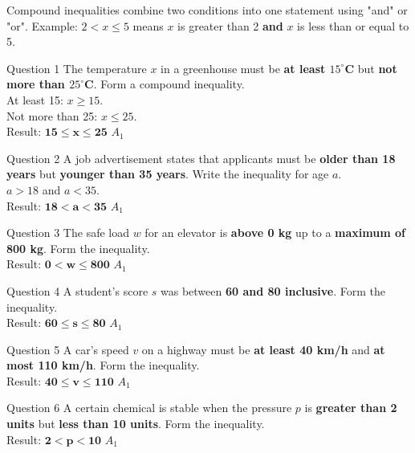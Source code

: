 \documentclass[12pt, a4paper, oneside]{article}
\begin{document}
\begin{tcolorbox}[colback=lightgrey, colframe=primaryblue, title=\textbf{Key Concept: Compound Inequalities}, arc=5pt]
    Compound inequalities combine two conditions into one statement using "and" or "or". 
    Example: $2 < x \leq 5$ means $x$ is greater than 2 \textbf{and} $x$ is less than or equal to 5.
\end{tcolorbox}

\begin{solvingbox}{Question 1}
The temperature $x$ in a greenhouse must be \textbf{at least $15^\circ$C} but \textbf{not more than $25^\circ$C}. Form a compound inequality. \\
At least 15: $x \geq 15$. \\
Not more than 25: $x \leq 25$. \\
Result: $\mathbf{15 \leq x \leq 25}$ \hfill $A_1$
\end{solvingbox}

\begin{solvingbox}{Question 2}
A job advertisement states that applicants must be \textbf{older than 18 years} but \textbf{younger than 35 years}. Write the inequality for age $a$. \\
$a > 18$ and $a < 35$. \\
Result: $\mathbf{18 < a < 35}$ \hfill $A_1$
\end{solvingbox}

\begin{solvingbox}{Question 3}
The safe load $w$ for an elevator is \textbf{above 0 kg} up to a \textbf{maximum of 800 kg}. Form the inequality. \\
Result: $\mathbf{0 < w \leq 800}$ \hfill $A_1$
\end{solvingbox}

\begin{solvingbox}{Question 4}
A student's score $s$ was between \textbf{60 and 80 inclusive}. Form the inequality. \\
Result: $\mathbf{60 \leq s \leq 80}$ \hfill $A_1$
\end{solvingbox}

\begin{solvingbox}{Question 5}
A car's speed $v$ on a highway must be \textbf{at least 40 km/h} and \textbf{at most 110 km/h}. Form the inequality. \\
Result: $\mathbf{40 \leq v \leq 110}$ \hfill $A_1$
\end{solvingbox}

\begin{solvingbox}{Question 6}
A certain chemical is stable when the pressure $p$ is \textbf{greater than 2 units} but \textbf{less than 10 units}. Form the inequality. \\
Result: $\mathbf{2 < p < 10}$ \hfill $A_1$
\end{solvingbox}
\end{document}

